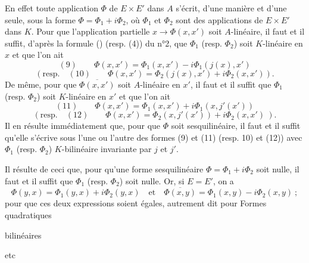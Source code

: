 En effet toute application $\Phi$ de $E\times E'$ dans $A$ s'écrit, d'une manière et d'une seule, sous la forme $\Phi=\Phi_1+i\Phi_2$, où $\Phi_1$ et $\Phi_2$ sont des applications de $E\times E'$ dans $K$. Pour que l'application partielle $x\longrightarrow\Phi(x,x')$ soit $A$-linéaire, il faut et il suffit, d'après la formule () (resp. (4)) du n°2, que $\Phi_1$ (resp. $\Phi_2$) soit $K$-linéaire en $x$ et que l'on ait
\[
(9)\qquad\Phi(x,x')=\Phi_1(x,x')-i\Phi_1(j(x),x')
\]
\[
(\text{resp.}\quad(10)\qquad\Phi(x,x')=\Phi_2(j(x),x')+i\Phi_2(x,x')).
\]
De même, pour que $\overline{\Phi(x,x')}$ soit $A$-linéaire en $x'$, il faut et il suffit que $\Phi_1$ (resp. $\Phi_2$) soit $K$-linéaire en $x'$ et que l'on ait
\[
(11)\qquad\Phi(x,x')=\Phi_1(x,x')+i\Phi_1(x,j'(x'))
\]
\[
(\text{resp.}\quad(12)\qquad\Phi(x,x')=\Phi_2(x,j'(x'))+i\Phi_2(x,x')\ ).
\]
Il en résulte immédiatement que, pour que $\Phi$ soit sesquilinéaire, il faut et il suffit qu'elle s'écrive sous l'une ou l'autre des formes (9) et (11) (resp. 10) et (12)) avec $\Phi_1$ (resp. $\Phi_2$) $K$-bilinéaire invariante par $j$ et $j'$.

Il résulte de ceci que, pour qu'une forme sesquilinéaire $\Phi=\Phi_1+i\Phi_2$ soit nulle, il faut et il suffit que $\Phi_1$ (resp. $\Phi_2$) soit nulle. Or, si $E=E'$, on a
\[
\Phi(y,x)=\Phi_1(y,x)+i\Phi_2(y,x)\quad\text{et}\quad\overline{\Phi(x,y)}=\Phi_1(x,y)-i\Phi_2(x,y)\ ;
\]
pour que ces deux expressions soient égales, autrement dit pour
Formes quadratiques

bilinéaires 

etc


